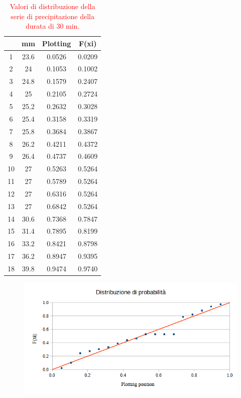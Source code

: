 \begin{table}[H] \centering
    \caption{\textcolor{red}{Valori di distribuzione della serie di precipitazione della durata di 30 min.}}
            \begin{tabular}{cccc}
                \toprule
               & mm   & Plotting & F(xi)  \\
            \midrule
            1  & 23.6 & 0.0526   & 0.0209 \\
            2  & 24   & 0.1053   & 0.1002 \\
            3  & 24.8 & 0.1579   & 0.2407 \\
            4  & 25   & 0.2105   & 0.2724 \\
            5  & 25.2 & 0.2632   & 0.3028 \\
            6  & 25.4 & 0.3158   & 0.3319 \\
            7  & 25.8 & 0.3684   & 0.3867 \\
            8  & 26.2 & 0.4211   & 0.4372 \\
            9  & 26.4 & 0.4737   & 0.4609 \\
            10 & 27   & 0.5263   & 0.5264 \\
            11 & 27   & 0.5789   & 0.5264 \\
            12 & 27   & 0.6316   & 0.5264 \\
            13 & 27   & 0.6842   & 0.5264 \\
            14 & 30.6 & 0.7368   & 0.7847 \\
            15 & 31.4 & 0.7895   & 0.8199 \\
            16 & 33.2 & 0.8421   & 0.8798 \\
            17 & 36.2 & 0.8947   & 0.9395 \\
            18 & 39.8 & 0.9474   & 0.9740 \\
            \bottomrule
            \end{tabular}
\end{table}

\begin{figure}[H]\centering
    \includegraphics[scale=0.75]{immagini/distr_prob_30min.png}
\end{figure}

